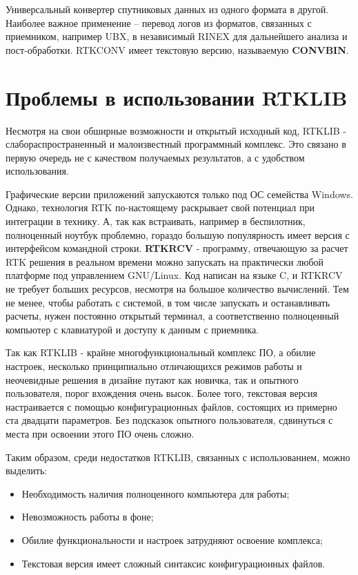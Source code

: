 Универсальный конвертер спутниковых данных из одного формата в другой. Наиболее важное применение – перевод логов из форматов, связанных с приемником, например UBX, в независимый RINEX для дальнейшего анализа и пост-обработки. RTKCONV имеет текстовую версию, называемую \textbf{CONVBIN}.

\section{Проблемы в использовании RTKLIB} \label{sect1_3}

Несмотря на свои обширные возможности и открытый исходный код, RTKLIB - слабораспространенный и малоизвестный программный комплекс. Это связано в первую очередь не с качеством получаемых результатов, а с удобством использования.

Графические версии приложений запускаются только под ОС семейства Windows. Однако, технология RTK по-настоящему раскрывает свой потенциал при интеграции в технику. А, так как встраивать, например в беспилотник, полноценный ноутбук проблемно, гораздо большую популярность имеет версия с интерфейсом командной строки. \textbf{RTKRCV} - программу, отвечающую за расчет RTK решения в реальном времени можно запускать на практически любой платформе под управлением GNU/Linux. Код написан на языке C, и RTKRCV не требует больших ресурсов, несмотря на большое количество вычислений. Тем не менее, чтобы работать с системой, в том числе запускать и останавливать расчеты, нужен постоянно открытый терминал, а соответственно полноценный компьютер с клавиатурой и доступу к данным с приемника.

Так как RTKLIB - крайне многофункциональный комплекс ПО, а обилие настроек, несколько принципиально отличающихся режимов работы и неочевидные решения в дизайне путают как новичка, так и опытного пользователя, порог вхождения очень высок. Более того, текстовая версия настраивается с помощью конфигурационных файлов, состоящих из примерно ста двадцати параметров. Без подсказок опытного пользователя, сдвинуться с места при освоении этого ПО очень сложно.

Таким образом, среди недостатков RTKLIB, связанных с использованием, можно выделить:

\begin{itemize}
  \item Необходимость наличия полноценного компьютера для работы;
  \item Невозможность работы в фоне;
  \item Обилие функциональности и настроек затрудняют освоение комплекса;
  \item Текстовая версия имеет сложный синтаксис конфигурационных файлов.
\end{itemize}


